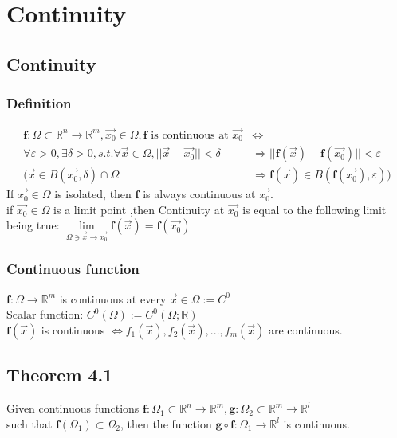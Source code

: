 \documentclass[11pt, a4paper]{article}
\begin{document}
\section{Continuity}
    \subsection{Continuity}
        \subsubsection{Definition}
        $$\begin{aligned}
            \bm{f}: \Omega \subset \mathbb{R}^n \to \mathbb{R}^m, \vec{x_0} \in \Omega, \bm{f} \text{ is continuous at } \vec{x_0} &\Leftrightarrow \\
            \forall \varepsilon > 0, \exists \delta > 0, s.t. \forall \vec{x} \in \Omega, ||\vec{x} - \vec{x_0}|| < \delta &\Rightarrow ||\bm{f}(\vec{x}) - \bm{f}(\vec{x_0})|| < \varepsilon \\
            (\vec{x} \in B(\vec{x_0}, \delta) \cap \Omega &\Rightarrow \bm{f}(\vec{x}) \in B(\bm{f}(\vec{x_0}), \varepsilon))
        \end{aligned}$$
        If $\vec{x_0} \in \Omega$ is isolated, then $\bm{f}$ is always continuous at $\vec{x_0}$. \\
        if $\vec{x_0} \in \Omega$ is a limit point ,then Continuity at $\vec{x_0}$ is equal to the following limit being true: $\lim\limits_{\Omega \ni \vec{x} \to \vec{x_0}}\bm{f}(\vec{x}) = \bm{f}(\vec{x_0})$
        \subsubsection{Continuous function}
        $\bm{f}: \Omega \to \mathbb{R}^m$ is continuous at every $\vec{x} \in \Omega := C^0$ \\
        Scalar function: $C^0(\Omega) := C^0(\Omega; \mathbb{R})$ \\
        $\bm{f}(\vec{x})$ is continuous $\Leftrightarrow f_1(\vec{x}), f_2(\vec{x}), ..., f_m(\vec{x})$ are continuous.
    \subsection{Theorem 4.1}
    Given continuous functions $\bm{f}: \Omega_1 \subset \mathbb{R}^n \to \mathbb{R}^m, \bm{g}: \Omega_2 \subset \mathbb{R}^m \to \mathbb{R}^l$ \\
    such that $\bm{f}(\Omega_1) \subset \Omega_2$, then the function $\bm{g} \circ \bm{f}: \Omega_1 \to \mathbb{R}^l$ is continuous.
    
\end{document}
